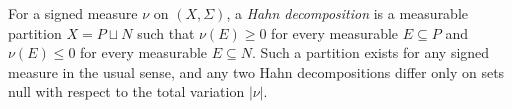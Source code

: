 
For a signed measure $\nu$ on $(X,\Sigma)$, a \emph{Hahn decomposition} is a measurable partition $X=P\sqcup N$ such that $\nu(E)\ge0$ for every measurable $E\subseteq P$ and $\nu(E)\le0$ for every measurable $E\subseteq N$. Such a partition exists for any signed measure in the usual sense, and any two Hahn decompositions differ only on sets null with respect to the total variation $|\nu|$.
